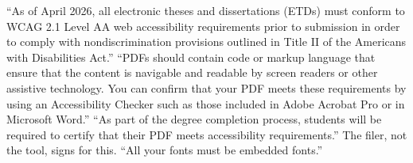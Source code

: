 %
%
%
\thesisrequiretagging
\thesisrequiredocumentlanguage
{}
	{``As of April 2026, all electronic theses and dissertations (ETDs) must
	 conform to WCAG 2.1 Level AA web accessibility requirements prior to
	 submission in order to comply with nondiscrimination provisions outlined in
	 Title II of the Americans with Disabilities Act.''}
	{``PDFs should contain code or markup language that ensure that the content
	 is navigable and readable by screen readers or other assistive technology.
	 You can confirm that your PDF meets these requirements by using an
	 Accessibility Checker such as those included in Adobe Acrobat Pro or in
	 Microsoft Word.''}
	{``As part of the degree completion process, students will be required to
	 certify that their PDF meets accessibility requirements.'' The filer, not
	 the tool, signs for this.}
	{``All your fonts must be embedded fonts.''}

